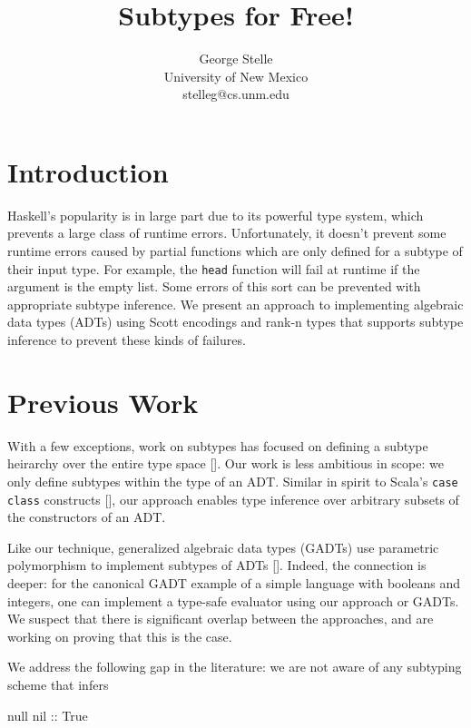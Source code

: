 \documentclass[]{article}
\title{Subtypes for Free!}
\author{George Stelle \\ University of New Mexico \\ stelleg@cs.unm.edu}
\date{}
\newenvironment{Shaded}{}{}
\newcommand{\DataTypeTok}[1]{\textcolor[rgb]{0.56,0.13,0.00}{{#1}}}
\newcommand{\OtherTok}[1]{\textcolor[rgb]{0.00,0.44,0.13}{{#1}}}
\newcommand{\NormalTok}[1]{{#1}}
\begin{document}
\maketitle

\section{Introduction}\label{introduction}

Haskell's popularity is in large part due to its powerful type system,
which prevents a large class of runtime errors. Unfortunately, it
doesn't prevent some runtime errors caused by partial functions which
are only defined for a subtype of their input type. For example, the
\texttt{head} function will fail at runtime if the argument is the empty
list. Some errors of this sort can be prevented with appropriate subtype
inference. We present an approach to implementing algebraic data types
(ADTs) using Scott encodings and rank-n types that supports subtype
inference to prevent these kinds of failures.

\section{Previous Work}\label{previous-work}

With a few exceptions, work on subtypes has focused on defining a
subtype heirarchy over the entire type space {[}\cite{mitchell1991type,
liskov1994behavioral}{]}. Our work is less ambitious in scope: we only
define subtypes within the type of an ADT. Similar in spirit to Scala's
\texttt{case class} constructs {[}\cite{odersky2004overview}{]}, our
approach enables type inference over arbitrary subsets of the
constructors of an ADT.

Like our technique, generalized algebraic data types (GADTs) use
parametric polymorphism to implement subtypes of ADTs
{[}\cite{fluet2006phantom}{]}. Indeed, the connection is deeper: for the
canonical GADT example of a simple language with booleans and integers,
one can implement a type-safe evaluator using our approach or GADTs. We
suspect that there is significant overlap between the approaches, and
are working on proving that this is the case.

We address the following gap in the literature: we are not aware of any
subtyping scheme that infers

\begin{Shaded}
\begin{Highlighting}[]
   \NormalTok{null}\OtherTok{ nil ::} \DataTypeTok{True}
\end{Highlighting}
\end{Shaded}
\end{document}

